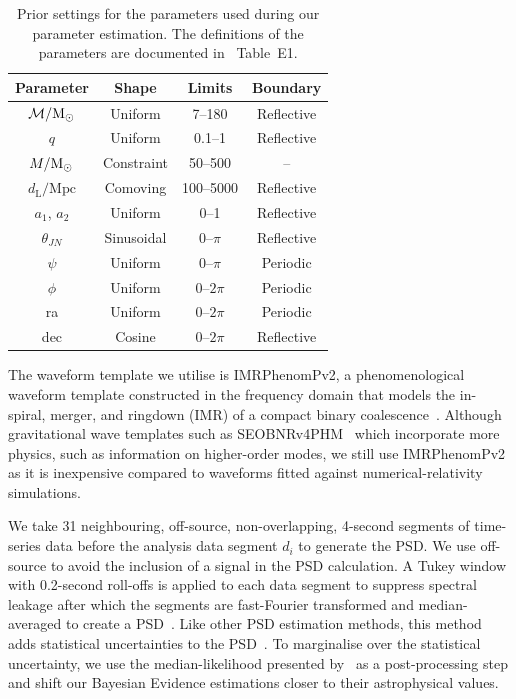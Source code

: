 \documentclass[%
 nofootinbib,
 amsmath,amssymb,
 aps,
 twocolumn
]{revtex4-2}
\newcommand{\imrphenomp}{{\sc IMRPhenomPv2}\xspace}
\newcommand{\seob}{{\sc SEOBNRv4PHM}\xspace}
\newcommand{\mathcmd}[1]{{\sc \relax\ifmmode#1\else $#1$\fi}\xspace}
\newcommand{\msun}{\mathcmd{\text{M}_\odot}}
\begin{document}
\begin{table}
    \centering
    \caption{
    Prior settings for the parameters used during our parameter estimation. The definitions of the parameters are documented in \citet{bilby_gwtc}~Table~E1.\label{tab:priors}}
    \begin{tabular}{c c c c}
    \hline
    Parameter & Shape & Limits & Boundary \\
    \hline
          $\mathcal{M}/\msun$           & Uniform & 7--180 & Reflective \\
          $q$                           & Uniform & 0.1--1 & Reflective \\
          $M/\msun$                     & Constraint & 50--500 & -- \\
          $d_\mathrm{L}/\mathrm{Mpc}$   & Comoving & 100--5000 & Reflective \\
          $a_1$, $a_2$                  & Uniform & 0--1 & Reflective \\
          $\theta_{JN}$                 & Sinusoidal & 0--$\pi$ &  Reflective \\
          $\psi$                        & Uniform & 0--$\pi$ &  Periodic \\
          $\phi$                        & Uniform & 0--$2\pi$ &  Periodic \\
          ra                            & Uniform & 0--$2\pi$ &  Periodic \\
          dec                           & Cosine & 0--$2\pi$ &  Reflective \\
    \hline
    \end{tabular}
\end{table}

The waveform template we utilise is \imrphenomp, a phenomenological waveform template constructed in the frequency domain that models the in-spiral, merger, and ringdown (IMR) of a compact binary coalescence~\citep{khan2016frequency}. Although gravitational wave templates such as \seob~\cite{seobnrv4phm} which incorporate more physics, such as information on higher-order modes, we still use \imrphenomp as it is inexpensive compared to waveforms fitted against numerical-relativity simulations.

We take 31 neighbouring, off-source, non-overlapping,  4-second  segments of time-series data before the analysis data segment $d_i$ to generate the PSD. We use off-source to avoid the inclusion of a signal in the PSD calculation. A Tukey window with 0.2-second roll-offs is applied to each data segment to suppress spectral leakage after which the segments are fast-Fourier transformed and median-averaged to create a PSD~\cite{ligo_psd}. Like other PSD estimation methods, this method adds statistical uncertainties to the PSD~\cite{psd_student_t, chatziioannou2019noise}. To marginalise over the statistical uncertainty, we use the median-likelihood presented by~\citet{psd_student_t} as a post-processing step and shift our Bayesian Evidence estimations closer to their astrophysical values. 
\end{document}
